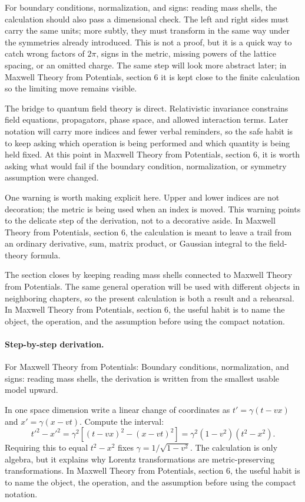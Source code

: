 For boundary conditions, normalization, and signs: reading mass shells, the calculation should also pass a dimensional check.  The left and right sides must carry the same units; more subtly, they must transform in the same way under the symmetries already introduced.  This is not a proof, but it is a quick way to catch wrong factors of \(2\pi\), signs in the metric, missing powers of the lattice spacing, or an omitted charge.  The same step will look more abstract later; in Maxwell Theory from Potentials, section 6 it is kept close to the finite calculation so the limiting move remains visible.

The bridge to quantum field theory is direct.  Relativistic invariance constrains field equations, propagators, phase space, and allowed interaction terms.  Later notation will carry more indices and fewer verbal reminders, so the safe habit is to keep asking which operation is being performed and which quantity is being held fixed.  At this point in Maxwell Theory from Potentials, section 6, it is worth asking what would fail if the boundary condition, normalization, or symmetry assumption were changed.

One warning is worth making explicit here.  Upper and lower indices are not decoration; the metric is being used when an index is moved.  This warning points to the delicate step of the derivation, not to a decorative aside.  In Maxwell Theory from Potentials, section 6, the calculation is meant to leave a trail from an ordinary derivative, sum, matrix product, or Gaussian integral to the field-theory formula.

The section closes by keeping reading mass shells connected to Maxwell Theory from Potentials.  The same general operation will be used with different objects in neighboring chapters, so the present calculation is both a result and a rehearsal.  In Maxwell Theory from Potentials, section 6, the useful habit is to name the object, the operation, and the assumption before using the compact notation.



\paragraph{Step-by-step derivation.}

For Maxwell Theory from Potentials: Boundary conditions, normalization, and signs: reading mass shells, the derivation is written from the smallest usable model upward.

In one space dimension write a linear change of coordinates as \(t'=\gamma(t-vx)\) and \(x'=\gamma(x-vt)\).  Compute the interval:
\[
  t'^2-x'^2
  =
  \gamma^2[(t-vx)^2-(x-vt)^2]
  =
  \gamma^2(1-v^2)(t^2-x^2).
\]
Requiring this to equal \(t^2-x^2\) fixes \(\gamma=1/\sqrt{1-v^2}\).  The calculation is only algebra, but it explains why Lorentz transformations are metric-preserving transformations.  In Maxwell Theory from Potentials, section 6, the useful habit is to name the object, the operation, and the assumption before using the compact notation.

